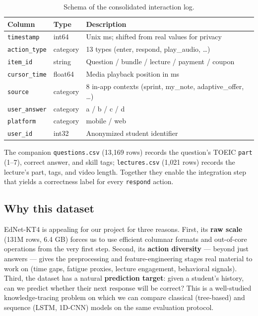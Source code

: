 \begin{table}[H]
\centering
\small
\begin{tabular}{lll}
\toprule
Column & Type & Description \\
\midrule
\texttt{timestamp}    & int64    & Unix ms; shifted from real values for privacy \\
\texttt{action\_type} & category & 13 types (enter, respond, play\_audio, \dots) \\
\texttt{item\_id}     & string   & Question / bundle / lecture / payment / coupon \\
\texttt{cursor\_time} & float64  & Media playback position in ms \\
\texttt{source}       & category & 8 in-app contexts (sprint, my\_note, adaptive\_offer, \dots) \\
\texttt{user\_answer} & category & a / b / c / d \\
\texttt{platform}     & category & mobile / web \\
\texttt{user\_id}     & int32    & Anonymized student identifier \\
\bottomrule
\end{tabular}
\caption{Schema of the consolidated interaction log.}
\end{table}

The companion \texttt{questions.csv} (13{,}169 rows) records the question's
TOEIC \texttt{part} (1--7), correct answer, and skill tags;
\texttt{lectures.csv} (1{,}021 rows) records the lecture's part, tags, and
video length. Together they enable the integration step that yields a
correctness label for every \texttt{respond} action.

\subsection{Why this dataset}

EdNet-KT4 is appealing for our project for three reasons. First, its
\textbf{raw scale} (131M rows, 6.4 GB) forces us to use efficient
columnar formats and out-of-core operations from the very first step.
Second, its \textbf{action diversity} — beyond just answers — gives the
preprocessing and feature-engineering stages real material to work on
(time gaps, fatigue proxies, lecture engagement, behavioral signals).
Third, the dataset has a natural \textbf{prediction target}: given a
student's history, can we predict whether their next response will be
correct? This is a well-studied knowledge-tracing problem on which we
can compare classical (tree-based) and sequence (LSTM, 1D-CNN) models
on the same evaluation protocol.
